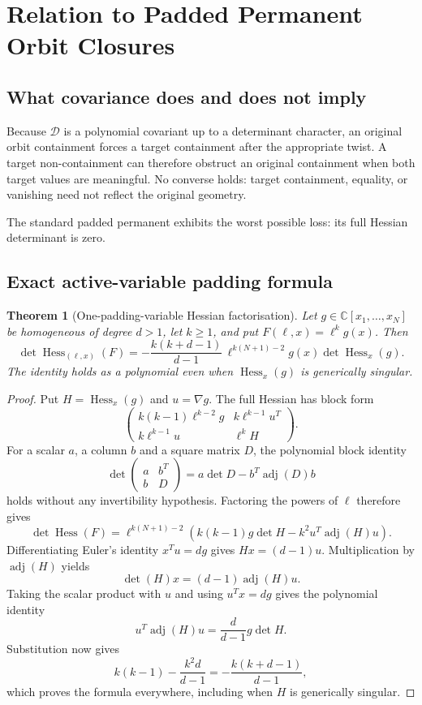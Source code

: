 \documentclass[11pt]{article}
\newtheorem{theorem}{Theorem}[section]
\theoremstyle{definition}
\theoremstyle{remark}
\DeclareMathOperator{\Hess}{Hess}
\newcommand{\C}{\mathbb C}
\begin{document}
\section{Relation to Padded Permanent Orbit Closures}

\subsection{What covariance does and does not imply}

Because $\mathcal D$ is a polynomial covariant up to a determinant character,
an original orbit containment forces a target containment after the appropriate
twist.  A target non-containment can therefore obstruct an original
containment when both target values are meaningful.  No converse holds: target
containment, equality, or vanishing need not reflect the original geometry.

The standard padded permanent exhibits the worst possible loss: its full
Hessian determinant is zero.

\subsection{Exact active-variable padding formula}

\begin{theorem}[One-padding-variable Hessian factorisation]\label{thm:paddingfactor}
Let $g\in\C[x_1,\ldots,x_N]$ be homogeneous of degree $d>1$, let $k\ge1$, and
put $F(\ell,x)=\ell^kg(x)$.  Then
\[
\det\Hess_{(\ell,x)}(F)
=-\frac{k(k+d-1)}{d-1}\,
\ell^{k(N+1)-2}g(x)\det\Hess_x(g).
\]
The identity holds as a polynomial even when $\Hess_x(g)$ is generically
singular.
\end{theorem}
\begin{proof}
Put $H=\Hess_x(g)$ and $u=\nabla g$.  The full Hessian has block form
\[
\begin{pmatrix}
k(k-1)\ell^{k-2}g & k\ell^{k-1}u^T\\
k\ell^{k-1}u & \ell^kH
\end{pmatrix}.
\]
For a scalar $a$, a column $b$ and a square matrix $D$, the polynomial block
identity
\[
\det\begin{pmatrix}a&b^T\\b&D\end{pmatrix}
=a\det D-b^T\operatorname{adj}(D)b
\]
holds without any invertibility hypothesis.  Factoring the powers of $\ell$
therefore gives
\[
\det\Hess(F)=\ell^{k(N+1)-2}
\left(k(k-1)g\det H-k^2u^T\operatorname{adj}(H)u\right).
\]
Differentiating Euler's identity $x^Tu=dg$ gives $Hx=(d-1)u$.
Multiplication by $\operatorname{adj}(H)$ yields
\[
\det(H)x=(d-1)\operatorname{adj}(H)u.
\]
Taking the scalar product with $u$ and using $u^Tx=dg$ gives the polynomial
identity
\[
u^T\operatorname{adj}(H)u=\frac{d}{d-1}g\det H.
\]
Substitution now gives
\[
 k(k-1)-\frac{k^2d}{d-1}
 =-\frac{k(k+d-1)}{d-1},
\]
which proves the formula everywhere, including when $H$ is generically
singular.
\end{proof}
\end{document}
